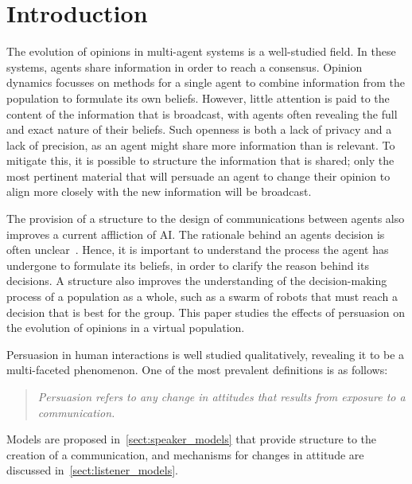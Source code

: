 \newpage

\chapter{Introduction}

The evolution of opinions in multi-agent systems is a well-studied field. In these systems, agents share information in order to reach a consensus. Opinion dynamics focusses on methods for a single agent to combine information from the population to formulate its own beliefs. However, little attention is paid to the content of the information that is broadcast, with agents often revealing the full and exact nature of their beliefs. Such openness is both a lack of privacy and a lack of precision, as an agent might share more information than is relevant. To mitigate this, it is possible to structure the information that is shared; only the most pertinent material that will persuade an agent to change their opinion to align more closely with the new information will be broadcast.

The provision of a structure to the design of communications between agents also improves a current affliction of AI. The rationale behind an agents decision is often unclear~\cite{Doran2017WhatPerspectives}. Hence, it is important to understand the process the agent has undergone to formulate its beliefs, in order to clarify the reason behind its decisions. A structure also improves the understanding of the decision-making process of a population as a whole, such as a swarm of robots that must reach a decision that is best for the group. This paper studies the effects of persuasion on the evolution of opinions in a virtual population. 

Persuasion in human interactions is well studied qualitatively, revealing it to be a multi-faceted phenomenon. One of the most prevalent definitions is as follows:

\begingroup
\addtolength\leftmargini{0.1in}
\begin{quote}
    \textit{Persuasion refers to any change in attitudes that results from exposure to a communication.} \cite{Petty1986CommunicationChange}
\end{quote}
\endgroup


Models are proposed in~\cref{sect:speaker_models} that provide structure to the creation of a communication, and mechanisms for changes in attitude are discussed in~\cref{sect:listener_models}. 

